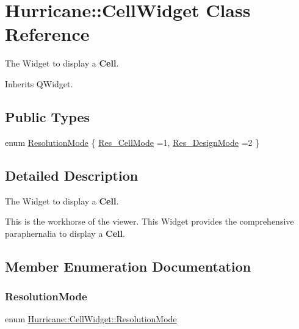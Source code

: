 \hypertarget{classHurricane_1_1CellWidget}{}\section{Hurricane\+:\+:Cell\+Widget Class Reference}
\label{classHurricane_1_1CellWidget}


The Widget to display a \textbf{ Cell}.  




Inherits Q\+Widget.

\subsection*{Public Types}
\begin{DoxyCompactItemize}
\item 
enum \hyperlink{classHurricane_1_1CellWidget_a4b81fed78775d491c169b649870d9dd7}{Resolution\+Mode} \{ \newline
\hyperlink{classHurricane_1_1CellWidget_a4b81fed78775d491c169b649870d9dd7af37fd1c10fd363f0ad04a94dbccd5789}{Res\+\_\+\+Cell\+Mode} =1, 
\newline
\hyperlink{classHurricane_1_1CellWidget_a4b81fed78775d491c169b649870d9dd7a0c7c9bd939930fe178b5b8bcd84bdc1e}{Res\+\_\+\+Design\+Mode} =2
 \}
\end{DoxyCompactItemize}


\subsection{Detailed Description}
The Widget to display a \textbf{ Cell}. 

This is the workhorse of the viewer. This Widget provides the comprehensive paraphernalia to display a \textbf{ Cell}. 

\subsection{Member Enumeration Documentation}
\mbox{\label{classHurricane_1_1CellWidget_a4b81fed78775d491c169b649870d9dd7}} 
\subsubsection{\texorpdfstring{Resolution\+Mode}{ResolutionMode}}
{\footnotesize\ttfamily enum \hyperlink{classHurricane_1_1CellWidget_a4b81fed78775d491c169b649870d9dd7}{Hurricane\+::\+Cell\+Widget\+::\+Resolution\+Mode}}

